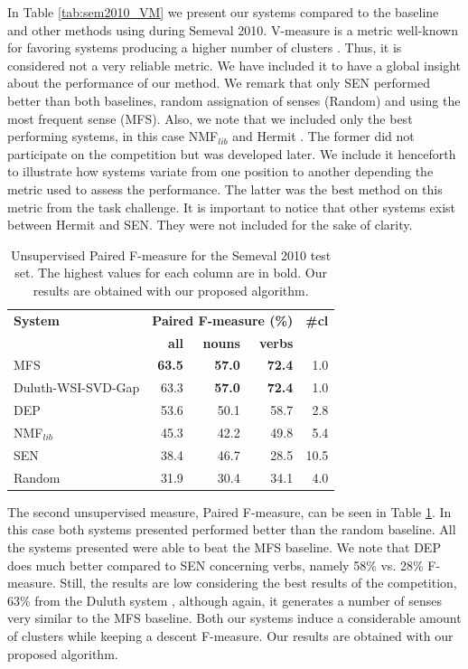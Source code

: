 In Table \ref{tab:sem2010_VM} we present our systems compared to the baseline and other methods using during Semeval 2010. V-measure is a metric well-known for favoring systems producing a higher number of clusters \cite{VandeCruys2011,pedersen2010duluth}. Thus, it is considered not a very reliable metric. We have included it to have a global insight about the performance of our method. We remark that only SEN performed better than both baselines, random assignation of senses (Random) and using the most frequent sense (MFS). Also, we note that we included only the best performing systems, in this case NMF$_{lib}$ \cite{VandeCruys2011} and   Hermit \cite{JurgensS10}. The former  did not participate on the competition but was developed later. We include it henceforth to illustrate how systems variate from one position to another depending the metric used to assess the performance. The latter was the best method on this metric from the task challenge. It is important to notice that other systems exist between Hermit and SEN. They were not included for the sake of clarity.

\begin{table}[]
\centering
\caption{Unsupervised Paired F-measure for the Semeval 2010 test set. The highest values for each column are in bold. Our results are obtained with our proposed algorithm.}
\begin{tabular}{@{}lrrrr@{}}
\toprule
\textbf{System} & \multicolumn{3}{c}{\textbf{Paired F-measure (\%)}} & \textbf{\#cl} \\
 & \textbf{all} & \textbf{nouns} & \textbf{verbs} & \\ \midrule

MFS & \textbf{63.5} & \textbf{57.0} & \textbf{72.4} & 1.0 \\
Duluth-WSI-SVD-Gap & 63.3 & \textbf{57.0} & \textbf{72.4} & 1.0 \\
DEP & 53.6 & 50.1 & 58.7 & 2.8 \\
NMF$_{lib}$&45.3&42.2&49.8&5.4\\
SEN & 38.4 & 46.7 & 28.5 & 10.5 \\
Random & 31.9 & 30.4 & 34.1 & 4.0 \\ \bottomrule
\end{tabular}

\label{tab:sem2010_FS}
\end{table}

The second unsupervised measure, Paired F-measure, can be seen in Table \ref{tab:sem2010_FS}. In this case both systems presented performed better than the random baseline. All the systems presented were able to beat the MFS baseline. We note that DEP does much better compared to SEN concerning verbs, namely 58\% vs. 28\% F-measure. Still, the results are low considering the best results of the competition, 63\% from the Duluth system \cite{Pedersen2010} , although again, it generates a number of senses very similar to the MFS baseline. Both our systems induce a considerable amount of clusters while keeping a descent F-measure. Our results are obtained with our proposed algorithm.



